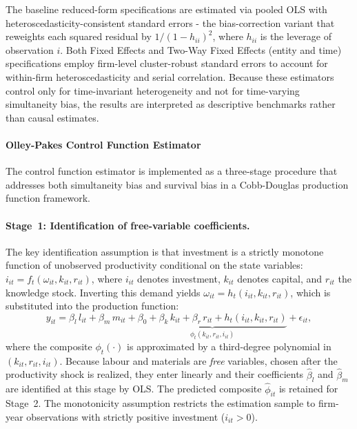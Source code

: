 \documentclass[a4paper, 12pt]{article}
\begin{document}
The baseline reduced-form specifications are estimated via pooled OLS with \textcite{mackinnon1985some} heteroscedasticity-consistent standard errors - the bias-correction variant that reweights each squared residual by $1/(1-h_{ii})^2$, where $h_{ii}$ is the leverage of observation $i$. Both Fixed Effects and Two-Way Fixed Effects (entity and time) specifications employ firm-level cluster-robust standard errors to account for within-firm heteroscedasticity and serial correlation. Because these estimators control only for time-invariant heterogeneity and not for time-varying simultaneity bias, the results are interpreted as descriptive benchmarks rather than causal estimates.


\paragraph{Olley-Pakes Control Function Estimator}

The \textcite{olley1992dynamics} control function estimator is implemented as a three-stage procedure that addresses both simultaneity bias and survival bias in a Cobb-Douglas production function framework.

\paragraph{Stage~1: Identification of free-variable coefficients.}
The key identification assumption is that investment is a strictly monotone function of unobserved productivity conditional on the state variables: $i_{it} = f_t(\omega_{it}, k_{it}, r_{it})$, where $i_{it}$ denotes investment, $k_{it}$ denotes capital, and $r_{it}$ the knowledge stock. Inverting this demand yields $\omega_{it} = h_t(i_{it}, k_{it}, r_{it})$, which is substituted into the production function:
\begin{equation}
  y_{it}
    = \beta_l \, l_{it} + \beta_m \, m_{it}
      + \underbrace{\beta_0 + \beta_k \, k_{it} + \beta_r \, r_{it}
        + h_t(i_{it}, k_{it}, r_{it})}_{\displaystyle \phi_t(k_{it}, r_{it}, i_{it})}
      + \epsilon_{it},
  \label{eq:op_s1}
\end{equation}
where the composite $\phi_t(\cdot)$ is approximated by a third-degree polynomial in $(k_{it}, r_{it}, i_{it})$. Because labour and materials are \emph{free} variables, chosen after the productivity shock is realized, they enter linearly and their coefficients $\hat\beta_l$ and $\hat\beta_m$ are identified at this stage by OLS. The predicted composite $\hat\phi_{it}$ is retained for Stage~2. The monotonicity assumption restricts the estimation sample to firm-year observations with strictly positive investment ($i_{it} > 0$).
\end{document}
